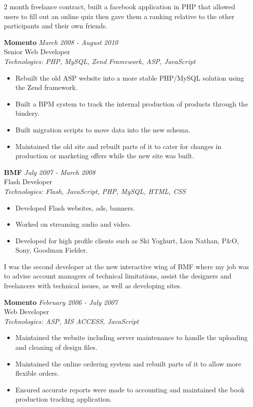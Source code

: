 \documentclass[a4paper,10pt]{article}
\begin{document}
2 month freelance contract, built a facebook application in PHP that allowed users to fill out an online quiz then gave them a ranking relative to the other participants and their own friends.

\vspace{1em}

\textbf{Momento} \hfill \textit{March 2008 - August 2010} \\
Senior Web Developer \\
\textit{Technologies: PHP, MySQL, Zend Framework, ASP, JavaScript}
\begin{itemize}
    \item Rebuilt the old ASP website into a more stable PHP/MySQL solution using the Zend framework.
    \item Built a BPM system to track the internal production of products through the bindery.
    \item Built migration scripts to move data into the new schema.
    \item Maintained the old site and rebuilt parts of it to cater for changes in production or marketing offers while the new site was built.
\end{itemize}

\vspace{1em}

\textbf{BMF} \hfill \textit{July 2007 - March 2008} \\
Flash Developer \\
\textit{Technologies: Flash, JavaScript, PHP, MySQL, HTML, CSS}
\begin{itemize}
    \item Developed Flash websites, ads, banners.
    \item Worked on streaming audio and video.
    \item Developed for high profile clients such as Ski Yoghurt, Lion Nathan, P\&O, Sony, Goodman Fielder.
\end{itemize}

I was the second developer at the new interactive wing of BMF where my job was to advise account managers of technical limitations, assist the designers and freelancers with technical issues, as well as developing sites.

\vspace{1em}

\textbf{Momento} \hfill \textit{February 2006 - July 2007} \\
Web Developer \\
\textit{Technologies: ASP, MS ACCESS, JavaScript}
\begin{itemize}
    \item Maintained the website including server maintenance to handle the uploading and cleaning of design files.
    \item Maintained the online ordering system and rebuilt parts of it to allow more flexible orders.
    \item Ensured accurate reports were made to accounting and maintained the book production tracking application.
\end{itemize}
\end{document}
